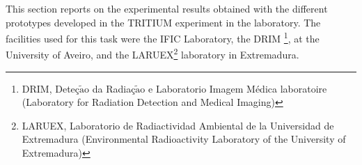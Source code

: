 This section reports on the experimental results obtained with the different prototypes developed in the TRITIUM experiment in the laboratory. The facilities used for this task were the IFIC Laboratory, the DRIM \footnote{DRIM, Deteç$\tilde{\text{a}}$o da Radiaç$\tilde{\text{a}}$o e Laboratorio Imagem Médica laboratoire (Laboratory for Radiation Detection and Medical Imaging)}, at the University of Aveiro, and the LARUEX\footnote{LARUEX, Laboratorio de Radiactividad Ambiental de la Universidad de Extremadura (Environmental Radioactivity Laboratory of the University of Extremadura)} laboratory in Extremadura.
